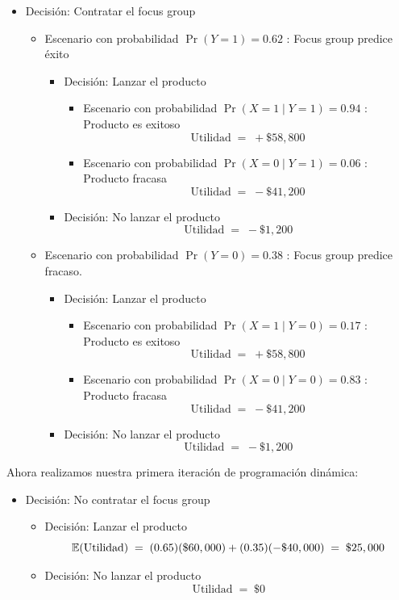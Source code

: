 \documentclass[ a4paper, twoside, 11pt]{article}
\begin{document}
\begin{problem}
\begin{itemize}
\item Decisi\'on: Contratar el focus group
\begin{itemize}

\item Escenario con probabilidad $\Pr(Y=1) = 0.62$ : Focus group predice \'exito
\begin{itemize}
\item Decisi\'on: Lanzar el producto
\begin{itemize}
\item Escenario con probabilidad $\Pr( X=1 \mid Y=1 ) = 0.94$ : Producto es exitoso
\[
\text{Utilidad} \; = \; +\$58,800
\]
\item Escenario con probabilidad $\Pr( X=0 \mid Y=1 ) = 0.06$ : Producto fracasa
\[
\text{Utilidad} \; = \; -\$41,200
\]
\end{itemize}
\item Decisi\'on: No lanzar el producto
\[
\text{Utilidad} \; = \; -\$1,200
\]
\end{itemize}

\item Escenario con probabilidad $\Pr(Y=0) = 0.38$ : Focus group predice fracaso.
\begin{itemize}
\item Decisi\'on: Lanzar el producto
\begin{itemize}
\item Escenario con probabilidad $\Pr( X=1 \mid Y=0 ) = 0.17$ : Producto es exitoso
\[
\text{Utilidad} \; = \; +\$58,800
\]
\item Escenario con probabilidad $\Pr( X=0 \mid Y=0 ) = 0.83$ : Producto fracasa
\[
\text{Utilidad} \; = \; -\$41,200
\]
\end{itemize}
\item Decisi\'on: No lanzar el producto
\[
\text{Utilidad} \; = \; -\$1,200
\]
\end{itemize}
\end{itemize}

\end{itemize}

Ahora realizamos nuestra primera iteraci\'on de programaci\'on din\'amica: 
\begin{itemize}

\item Decisi\'on: No contratar el focus group
\begin{itemize}
\item Decisi\'on: Lanzar el producto
\[
\mathbb{E}(\text{Utilidad}) \; = \;
(0.65)(\$60,000) + (0.35)(-\$40,000) \; = \;
\$25,000
\]
\item Decisi\'on: No lanzar el producto
\[
\text{Utilidad} \; = \; \$0
\]
\end{itemize}


\end{itemize}
\end{problem}
\end{document}
